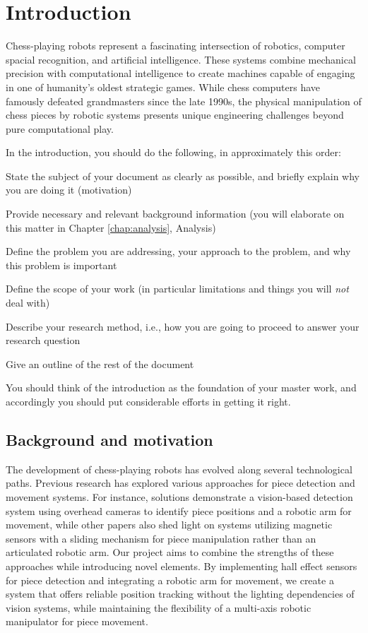 
\chapter{Introduction}
\label{chap:intro}

Chess-playing robots represent a fascinating intersection of robotics, computer spacial recognition, and artificial intelligence. These systems combine mechanical precision with computational intelligence to create machines capable of engaging in one of humanity's oldest strategic games. While chess computers have famously defeated grandmasters since the late 1990s, the physical manipulation of chess pieces by robotic systems presents unique engineering challenges beyond pure computational play.

In the introduction, you should do the following, in approximately this order:
\begin{compactitem}
  \item State the subject of your document as clearly as possible, and briefly explain why you are doing it (motivation)
  \item Provide necessary and relevant background information (you will elaborate on this matter in Chapter \ref{chap:analysis}, Analysis)
  \item Define the problem you are addressing, your approach to the problem, and why this problem is important
  \item Define the scope of your work (in particular limitations and things you will {\em not} deal with)
  \item Describe your research method, i.e., how you are going to proceed to answer your research question
  \item Give an outline of the rest of the document
\end{compactitem}

You should think of the introduction  as the foundation of your master work, and accordingly you should put considerable efforts in getting it right.


\section{Background and motivation}
\label{sec:background-motivation}

The development of chess-playing robots has evolved along several technological paths. Previous research has explored various approaches for piece detection and movement systems. For instance, solutions demonstrate a vision-based detection system using overhead cameras to identify piece positions and a robotic arm for movement, while other papers also shed light on systems utilizing magnetic sensors with a sliding mechanism for piece manipulation rather than an articulated robotic arm.
Our project aims to combine the strengths of these approaches while introducing novel elements. By implementing hall effect sensors for piece detection and integrating a robotic arm for movement, we create a system that offers reliable position tracking without the lighting dependencies of vision systems, while maintaining the flexibility of a multi-axis robotic manipulator for piece movement.

